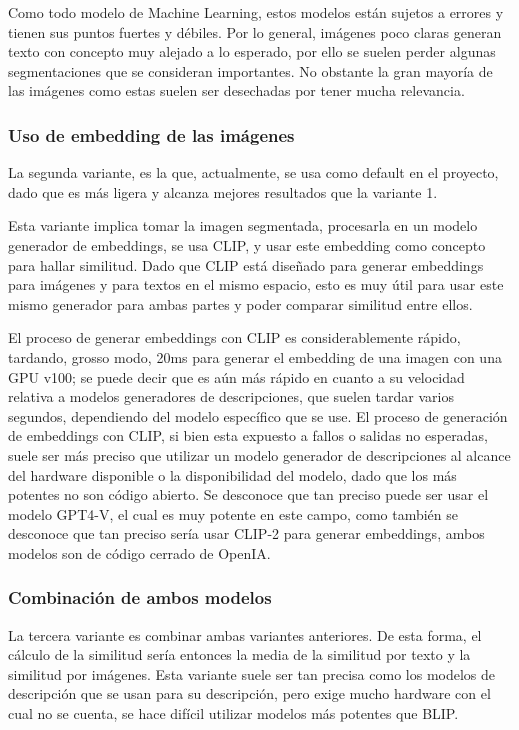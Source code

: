 Como todo modelo de Machine Learning, estos modelos están sujetos a errores y tienen sus puntos fuertes y débiles. Por lo general, imágenes poco claras generan texto con concepto muy alejado a lo esperado, por ello se suelen perder algunas segmentaciones que se consideran importantes. No obstante la gran mayoría de las imágenes como estas suelen ser desechadas por tener mucha relevancia.

\subsubsection*{Uso de embedding de las imágenes}
La segunda variante, es la que, actualmente, se usa como default en el proyecto, dado que es más ligera y alcanza mejores resultados que la variante 1.

Esta variante implica tomar la imagen segmentada, procesarla en un modelo generador de embeddings, se usa CLIP, y usar este embedding como concepto para hallar similitud. Dado que CLIP está diseñado para generar embeddings para imágenes y para textos en el mismo espacio, esto es muy útil para usar este mismo generador para ambas partes y poder comparar similitud entre ellos.

El proceso de generar embeddings con CLIP es considerablemente rápido, tardando, grosso modo, 20ms para generar el embedding de una imagen con una GPU v100; se puede decir que es aún más rápido en cuanto a su velocidad relativa a modelos generadores de descripciones, que suelen tardar varios segundos, dependiendo del modelo específico que se use. El proceso de generación de embeddings con CLIP, si bien esta expuesto a fallos o salidas no esperadas, suele ser más preciso que utilizar un modelo generador de descripciones al alcance del hardware disponible o la disponibilidad del modelo, dado que los más potentes no son código abierto. Se desconoce que tan preciso puede ser usar el modelo GPT4-V, el cual es muy potente en este campo, como también se desconoce que tan preciso sería usar CLIP-2 para generar embeddings, ambos modelos son de código cerrado de OpenIA.

\subsubsection*{Combinaci\'on de ambos modelos}
La tercera variante es combinar ambas variantes anteriores. De esta forma, el cálculo de la similitud sería entonces la media de la similitud por texto y la similitud por imágenes. Esta variante suele ser tan precisa como los modelos de descripción que se usan para su descripción, pero exige mucho hardware con el cual no se cuenta, se hace dif\'icil utilizar modelos más potentes que BLIP.

